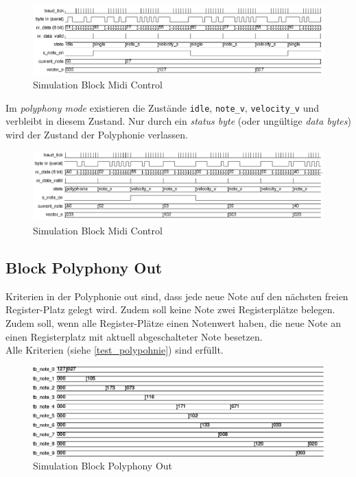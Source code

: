 \begin{figure}[H]
	\includegraphics[width=1\textwidth]{images/midi_control/wave_single.png}
	\caption{Simulation Block Midi Control}
	\label{fig.test_midi:control_single}
\end{figure} 

Im \textit{polyphony mode} existieren die Zustände \lstinline|idle|, \lstinline|note_v|, \lstinline|velocity_v| und verbleibt in diesem Zustand. Nur durch ein \textit{status byte} (oder ungültige \textit{data bytes}) wird der Zustand der Polyphonie verlassen.

\begin{figure}[H]
	\includegraphics[width=1\textwidth]{images/midi_control/wave_polyphonie.png}
	\caption{Simulation Block Midi Control}
	\label{fig.test_midi:control}
\end{figure} 

\subsection{Block Polyphony Out}

Kriterien in der Polyphonie out sind, dass jede neue Note auf den nächsten freien Register-Platz gelegt wird. Zudem soll keine Note zwei Registerplätze belegen. Zudem soll, wenn alle Register-Plätze einen Notenwert haben, die neue Note an einen Registerplatz mit aktuell abgeschalteter Note besetzen.\\
Alle Kriterien (siehe \ref {test_polypohnie}) sind erfüllt.

\begin{figure}[H]
	\includegraphics[width=1\textwidth]{images/midi_interface/tb_polyphonie.png}
	\caption{Simulation Block Polyphony Out}
	\label{fig.test_polyphonie}
\end{figure} 
